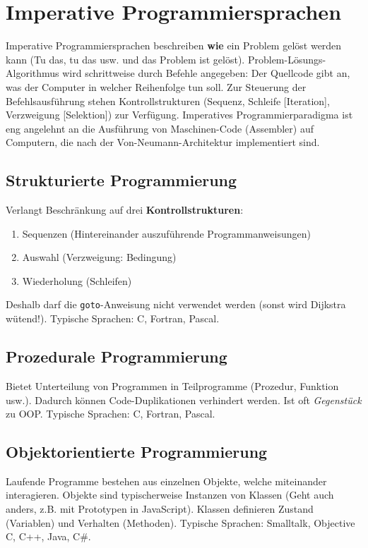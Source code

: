 \section{Imperative Programmiersprachen}

Imperative Programmiersprachen beschreiben \textbf{wie} ein Problem gelöst werden kann (Tu das, tu das usw. und das Problem ist gelöst). Problem-Lösungs-Algorithmus wird schrittweise durch Befehle angegeben: Der Quellcode gibt an, was der Computer in welcher Reihenfolge tun soll. Zur Steuerung der Befehlsausführung stehen Kontrollstrukturen (Sequenz, Schleife [Iteration], Verzweigung [Selektion]) zur Verfügung. Imperatives Programmierparadigma ist eng angelehnt an die Ausführung von Maschinen-Code (Assembler) auf Computern, die nach der Von-Neumann-Architektur implementiert sind.

\subsection{Strukturierte Programmierung}

Verlangt Beschränkung auf drei \textbf{Kontrollstrukturen}:
\begin{enumerate}
	\item Sequenzen (Hintereinander auszuführende Programmanweisungen)
	\item Auswahl (Verzweigung: Bedingung)
	\item Wiederholung (Schleifen)
\end{enumerate}
Deshalb darf die \texttt{goto}-Anweisung nicht verwendet werden (sonst wird Dijkstra wütend!). Typische Sprachen: C, Fortran, Pascal.

\subsection{Prozedurale Programmierung}

Bietet Unterteilung von Programmen in Teilprogramme (Prozedur, Funktion usw.). Dadurch können Code-Duplikationen verhindert werden. Ist oft \textit{Gegenstück} zu OOP. Typische Sprachen: C, Fortran, Pascal.

\subsection{Objektorientierte Programmierung}

Laufende Programme bestehen aus einzelnen Objekte, welche miteinander interagieren. Objekte sind typischerweise Instanzen von Klassen (Geht auch anders, z.B. mit Prototypen in JavaScript). Klassen definieren Zustand (Variablen) und Verhalten (Methoden). Typische Sprachen: Smalltalk, Objective C, C++, Java, C\#.

